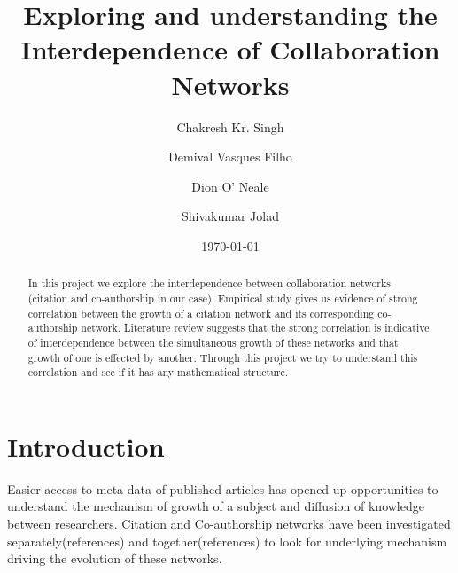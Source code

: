 \documentclass[aps, pre, twocolumn, nofootinbib]{revtex4-1}
\begin{document}

\title{Exploring and understanding the Interdependence of Collaboration Networks}

\author{Chakresh Kr. Singh}
\author{Demival Vasques Filho}
\author{Dion O' Neale}

\author{Shivakumar Jolad}


\date{\today}

\begin{abstract}
In this project we explore the interdependence between collaboration networks (citation and co-authorship in our case). Empirical study gives us evidence of strong correlation between the growth of a citation network and its corresponding co-authorship network. Literature review suggests that the strong correlation is indicative of interdependence between the simultaneous growth of these networks and that growth of one is effected by another. Through this project we try to understand this correlation and see if it has any mathematical structure.


\end{abstract}

\maketitle


\section{Introduction}

Easier access to meta-data of published articles has opened up opportunities to understand the mechanism of growth of a subject and diffusion of knowledge between researchers. Citation and Co-authorship networks have been investigated separately(references) and together(references) to look for underlying mechanism driving the evolution of these networks.
\end{document}
